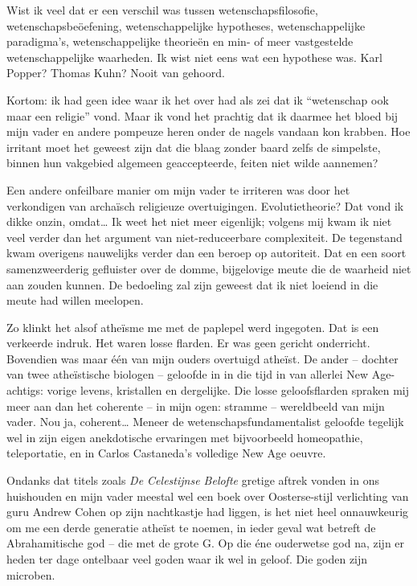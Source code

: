 \documentclass[12pt,a4paper]{article}
\begin{document}
Wist ik veel dat er een verschil was tussen wetenschapsfilosofie, weten\-schaps\-beöef\-ening, wetenschappelijke hypotheses, wetenschappelijke paradigma's, wetenschappelijke theorieën en min- of meer vastgestelde wetenschappelijke waarheden. Ik wist niet eens wat een hypothese was. Karl Popper? Thomas Kuhn? Nooit van gehoord.

Kortom: ik had geen idee waar ik het over had als zei dat ik “wetenschap ook maar een religie” vond. Maar ik vond het prachtig dat ik daarmee het bloed bij mijn vader en andere pompeuze heren onder de nagels vandaan kon krabben. Hoe irritant moet het geweest zijn dat die blaag zonder baard zelfs de simpelste, binnen hun vakgebied algemeen geaccepteerde, feiten niet wilde aannemen?

Een andere onfeilbare manier om mijn vader te irriteren was door het verkondigen van archaïsch religieuze overtuigingen. Evolutietheorie? Dat vond ik dikke onzin, omdat… Ik weet het niet meer eigenlijk; volgens mij kwam ik niet veel verder dan het argument van niet-reduceerbare complexiteit. De tegenstand kwam overigens nauwelijks verder dan een beroep op autoriteit. Dat en een soort samenzweerderig gefluister over de domme, bijgelovige meute die de waarheid niet aan zouden kunnen. De bedoeling zal zijn geweest dat ik niet loeiend in die meute had willen meelopen.

Zo klinkt het alsof atheïsme me met de paplepel werd ingegoten. Dat is een verkeerde indruk. Het waren losse flarden. Er was geen gericht onderricht. Bovendien was maar één van mijn ouders overtuigd atheïst. De ander – dochter van twee atheïstische biologen – geloofde in in die tijd in van allerlei New Age-achtigs: vorige levens, kristallen en dergelijke. Die losse geloofsflarden spraken mij meer aan dan het coherente – in mijn ogen: stramme – wereldbeeld van mijn vader. Nou ja, coherent… Meneer de wetenschapsfundamentalist geloofde tegelijk wel in zijn eigen anekdotische ervaringen met bijvoorbeeld homeopathie, teleportatie, en in Carlos Castaneda's volledige New Age oeuvre.

Ondanks dat titels zoals \emph{De Celestijnse Belofte} gretige aftrek vonden in ons huishouden en mijn vader meestal wel een boek over Oosterse-stijl verlichting van guru Andrew Cohen op zijn nachtkastje had liggen, is het niet heel onnauwkeurig om me een derde generatie atheïst te noemen, in ieder geval wat betreft de Abrahamitische god – die met de grote G. Op die éne ouderwetse god na, zijn er heden ter dage ontelbaar veel goden waar ik wel in geloof. Die goden zijn microben.
\end{document}
